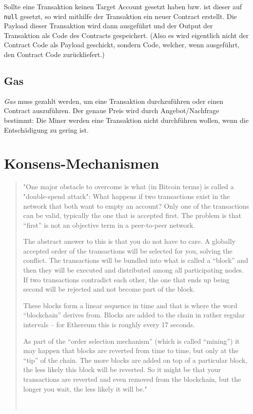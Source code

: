 Sollte eine Transaktion keinen Target Account gesetzt haben bzw. ist dieser auf \texttt{null} gesetzt, so wird mithilfe der Transaktion ein neuer Contract erstellt. Die Payload dieser Transaktion wird dann ausgeführt und der Output der Transaktion als Code des Contracts gespeichert. (Also es wird eigentlich nicht der Contract Code als Payload geschickt, sondern Code, welcher, wenn ausgeführt, den Contract Code zurückliefert.)

\subsection{Gas}
\textit{Gas} muss gezahlt werden, um eine Transaktion durchzuführen oder einen Contract auszuführen. Der genaue Preis wird durch Angebot/Nachfrage bestimmt: Die Miner werden eine Transaktion nicht durchführen wollen, wenn die Entschädigung zu gering ist.

\section{Konsens-Mechanismen}
\begin{quote}
\begin{itshape}
"One major obstacle to overcome is what (in Bitcoin terms) is called a "double-spend attack": What happens if two transactions exist in the network that both want to empty an account? Only one of the transactions can be valid, typically the one that is accepted first. The problem is that “first” is not an objective term in a peer-to-peer network.

The abstract answer to this is that you do not have to care. A globally accepted order of the transactions will be selected for you, solving the conflict. The transactions will be bundled into what is called a “block” and then they will be executed and distributed among all participating nodes. If two transactions contradict each other, the one that ends up being second will be rejected and not become part of the block.

These blocks form a linear sequence in time and that is where the word “blockchain” derives from. Blocks are added to the chain in rather regular intervals -- for Ethereum this is roughly every 17 seconds.

As part of the “order selection mechanism” (which is called “mining”) it may happen that blocks are reverted from time to time, but only at the “tip” of the chain. The more blocks are added on top of a particular block, the less likely this block will be reverted. So it might be that your transactions are reverted and even removed from the blockchain, but the longer you wait, the less likely it will be."
\end{itshape}
\ \cite[Solidity Docs, Blocks]{Blocks_Solidity}
\end{quote}

